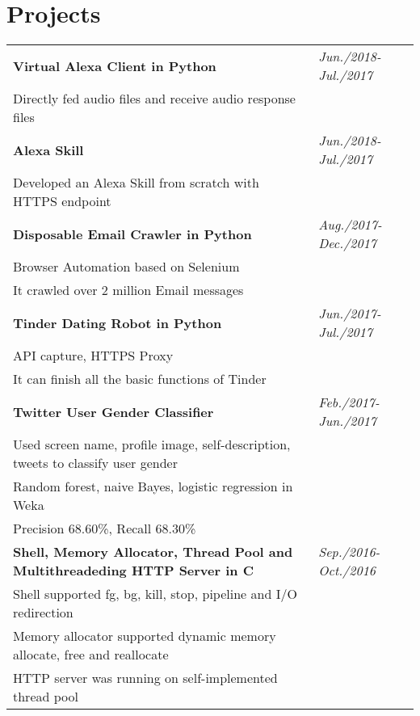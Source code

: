 \documentclass[a4paper,10pt]{article}
\begin{document}
\vspace{-0.6cm}

\section{Projects}
\vspace{-0.4cm}

\begin{longtable}{p{15cm}p{3cm}}
\textbf{Virtual Alexa Client in Python} & \emph{Jun./2018-Jul./2017} \\
\hspace{1em} Directly fed audio files and receive audio response files \\

\textbf{Alexa Skill} & \emph{Jun./2018-Jul./2017} \\
\hspace{1em} Developed an Alexa Skill from scratch with HTTPS endpoint\\

\textbf{Disposable Email Crawler in Python} & \emph{Aug./2017-Dec./2017} \\
\hspace{1em} Browser Automation based on Selenium\\
\hspace{1em} It crawled over 2 million Email messages\\

\textbf{Tinder Dating Robot in Python} & \emph{Jun./2017-Jul./2017} \\
\hspace{1em} API capture, HTTPS Proxy \\
\hspace{1em} It can finish all the basic functions of Tinder\\

\textbf{Twitter User Gender Classifier} & \emph{Feb./2017-Jun./2017} \\
\hspace{1em} Used screen name, profile image, self-description, tweets to classify user gender \\
\hspace{1em} Random forest, naive Bayes, logistic regression in Weka \\
\hspace{1em} Precision 68.60\%, Recall 68.30\% \\

\textbf{Shell, Memory Allocator, Thread Pool and Multithreadeding HTTP Server in C} & \emph{Sep./2016-Oct./2016} \\
\hspace{1em} Shell supported fg, bg, kill, stop, pipeline and I/O redirection \\
\hspace{1em} Memory allocator supported dynamic memory allocate, free and reallocate \\
\hspace{1em} HTTP server was running on self-implemented thread pool \\
\end{longtable}
\end{document}
